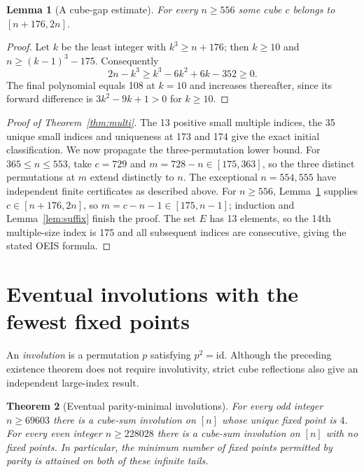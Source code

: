 \documentclass[9pt]{extarticle}
\newtheorem{theorem}{Theorem}[section]
\newtheorem{lemma}[theorem]{Lemma}
\begin{document}
\begin{lemma}[A cube-gap estimate]\label{lem:gap}
For every $n\ge556$ some cube $c$ belongs to $[n+176,2n]$.
\end{lemma}
\begin{proof}
Let $k$ be the least integer with $k^3\ge n+176$; then $k\ge10$ and $n\ge(k-1)^3-175$. Consequently
\[
2n-k^3\ge k^3-6k^2+6k-352\ge0.
\]
The final polynomial equals 108 at $k=10$ and increases thereafter, since its forward difference is $3k^2-9k+1>0$ for $k\ge10$.
\end{proof}
\begin{proof}[Proof of Theorem~\ref{thm:multi}]
The 13 positive small multiple indices, the 35 unique small indices and uniqueness at 173 and 174 give the exact initial classification. We now propagate the three-permutation lower bound. For $365\le n\le553$, take $c=729$ and $m=728-n\in[175,363]$, so the three distinct permutations at $m$ extend distinctly to $n$. The exceptional $n=554, 555$ have independent finite certificates as described above. For $n\ge556$, Lemma~\ref{lem:gap} supplies $c\in[n+176,2n]$, so $m=c-n-1\in[175,n-1]$; induction and Lemma~\ref{lem:suffix} finish the proof. The set $E$ has 13 elements, so the 14th multiple-size index is 175 and all subsequent indices are consecutive, giving the stated OEIS formula.
\end{proof}


\section{Eventual involutions with the fewest fixed points}\label{sec:invol}
An \emph{involution} is a permutation $p$ satisfying $p^2=\mathrm{id}$.
Although the preceding existence theorem does not require involutivity,
strict cube reflections also give an independent large-index result.

\begin{theorem}[Eventual parity-minimal involutions]\label{thm:involtail}
For every odd integer $n\ge69603$ there is a cube-sum involution on
$[n]$ whose unique fixed point is $4$.  For every even integer
$n\ge228028$ there is a cube-sum involution on $[n]$ with no fixed
points.  In particular, the minimum number of fixed points permitted by
parity is attained on both of these infinite tails.
\end{theorem}
\end{document}

